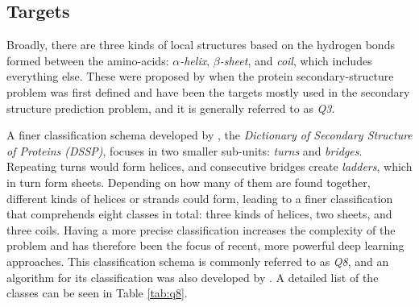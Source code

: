 \subsection{Targets}
Broadly, there are three kinds of local structures based on the hydrogen bonds formed between the amino-acids: $\alpha$\textit{-helix}, $\beta$\textit{-sheet}, and \textit{coil}, which includes everything else. These were proposed by \cite{Pauling1951} when the protein secondary-structure problem was first defined and have been the targets mostly used in the secondary structure prediction problem, and it is generally referred to as \textit{Q3}.

A finer classification schema developed by \cite{Kabsch1983}, the \textit{Dictionary of Secondary Structure of Proteins (DSSP)}, focuses in two smaller sub-units: \textit{turns} and \textit{bridges}. Repeating turns would form helices, and consecutive bridges create \textit{ladders}, which in turn form sheets. Depending on how many of them are found together, different kinds of helices or strands could form, leading to a finer classification that comprehends eight classes in total: three kinds of helices, two sheets, and three coils. Having a more precise classification increases the complexity of the problem and has therefore been the focus of recent, more powerful deep learning approaches. This classification schema is commonly referred to as \textit{Q8}, and an algorithm for its classification was also developed by \cite{Kabsch1983}. A detailed list of the classes can be seen in Table \ref{tab:q8}.


